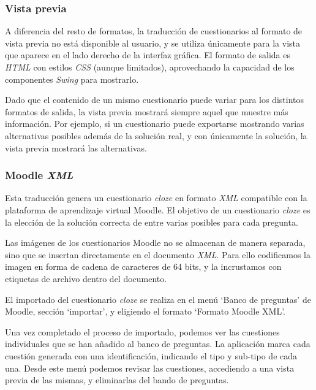 
\subsubsection{Vista previa}
A diferencia del resto de formatos, la traducción de cuestionarios al formato de vista previa no está disponible al usuario, y se utiliza únicamente para la vista que aparece en el lado derecho de la interfaz gráfica.
El formato de salida es \emph{HTML} con estilos \emph{CSS} (aunque limitados), aprovechando la capacidad de los componentes \emph{Swing} para mostrarlo.

Dado que el contenido de un mismo cuestionario puede variar para los distintos formatos de salida, la vista previa mostrará siempre aquel que muestre más información.
Por ejemplo, si un cuestionario puede exportarse mostrando varias alternativas posibles además de la solución real, y con únicamente la solución, la vista previa mostrará las alternativas.

\subsubsection{Moodle \emph{XML}}
Esta traducción genera un cuestionario \emph{cloze} en formato \emph{XML} compatible con la plataforma de aprendizaje virtual Moodle.
El objetivo de un cuestionario \emph{cloze} es la elección de la solución correcta de entre varias posibles para cada pregunta.

Las imágenes de los cuestionarios Moodle no se almacenan de manera separada, sino que se insertan directamente en el documento \emph{XML}.
Para ello codificamos la imagen en forma de cadena de caracteres de 64 bits, y la incrustamos con etiquetas de archivo dentro del documento.

El importado del cuestionario \emph{cloze} se realiza en el menú `Banco de preguntas' de Moodle, sección `importar', y eligiendo el formato `Formato Moodle XML'.


Una vez completado el proceso de importado, podemos ver las cuestiones individuales que se han añadido al banco de preguntas.
La aplicación marca cada cuestión generada con una identificación, indicando el tipo y sub-tipo de cada una.
Desde este menú podemos revisar las cuestiones, accediendo a una vista previa de las mismas, y eliminarlas del bando de preguntas.

